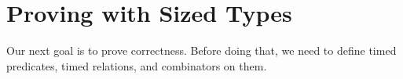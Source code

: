 \begin{code}
\AgdaSymbol{(}\AgdaSpace{}%
\AgdaSpace{}%
\AgdaSpace{}%
\AgdaOperator{\AgdaInductiveConstructor{,}}\AgdaSpace{}%
\AgdaSpace{}%
\AgdaSpace{}%
\AgdaSymbol{)}\<%
\\
%
\\[\AgdaEmptyExtraSkip]%
\>[0]\AgdaSpace{}%
\AgdaSymbol{:}\AgdaSpace{}%
\AgdaSpace{}%
\AgdaSpace{}%
\<%
\\
\>[0]\AgdaSpace{}%
\AgdaSpace{}%
\AgdaSymbol{=}\AgdaSpace{}%
\AgdaSpace{}%
\AgdaSymbol{(}\AgdaSymbol{(}\AgdaSpace{}%
\AgdaSpace{}%
\AgdaSpace{}%
\AgdaSymbol{\{}\AgdaSymbol{\}))}\AgdaSpace{}%
\<%
\end{code}

\section{Proving with Sized Types}
Our next goal is to prove correctness.
Before doing that, we need to define timed predicates, timed relations, and combinators on them.

\begin{code}%
\>[0]\AgdaSpace{}%
\AgdaSymbol{:}\AgdaSpace{}%
\AgdaSpace{}%
\AgdaSpace{}%
\<%
\\
\>[0]\AgdaSpace{}%
\AgdaSpace{}%
\AgdaSymbol{=}\AgdaSpace{}%
\AgdaSymbol{\{}\AgdaSpace{}%
\AgdaSymbol{:}\AgdaSpace{}%
\AgdaSymbol{\}}\AgdaSpace{}%
\AgdaSpace{}%
\AgdaSpace{}%
\AgdaSpace{}%
\AgdaSpace{}%
\<%
\\
%
\\[\AgdaEmptyExtraSkip]%
\>[0]\AgdaSpace{}%
\AgdaSymbol{:}\AgdaSpace{}%
\AgdaSpace{}%
\AgdaSpace{}%
\AgdaSpace{}%
\AgdaSpace{}%
\<%
\\
\>[0]\AgdaSpace{}%
\AgdaSpace{}%
\AgdaSpace{}%
\AgdaSymbol{=}\AgdaSpace{}%
\AgdaSymbol{\{}\AgdaSpace{}%
\AgdaSymbol{:}\AgdaSpace{}%
\AgdaSymbol{\}}\AgdaSpace{}%
\AgdaSpace{}%
\AgdaSpace{}%
\AgdaSpace{}%
\AgdaSpace{}%
\AgdaSpace{}%
\AgdaSpace{}%
\AgdaSpace{}%
\<%
\end{code}

